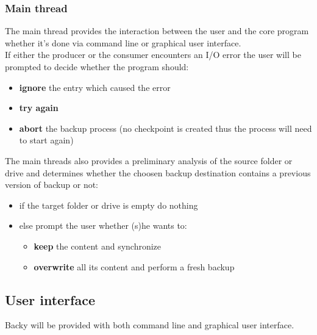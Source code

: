 \documentclass[a4paper]{article}
\begin{document}
      \subsubsection{Main thread}
        The main thread provides the interaction between the user and the core program whether it's done via command line or graphical user interface. \\
        \indent If either the producer or the consumer encounters an I/O error the user will be prompted to decide whether the program should:
        \begin{itemize}
          \item \textbf{ignore} the entry which caused the error
          \item \textbf{try again}
          \item \textbf{abort} the backup process (no checkpoint is created thus the process will need to start again)
        \end{itemize}
        \indent The main threads also provides a preliminary analysis of the source folder or drive and determines whether the choosen backup destination contains a previous version of backup or not:
        \begin{itemize}
          \item if the target folder or drive is empty do nothing
          \item else prompt the user whether (s)he wants to:
            \begin{itemize}
              \item \textbf{keep} the content and synchronize
              \item \textbf{overwrite} all its content and perform a fresh backup
            \end{itemize}
        \end{itemize}
    \subsection{User interface}
      Backy will be provided with both command line and graphical user interface.
\end{document}
